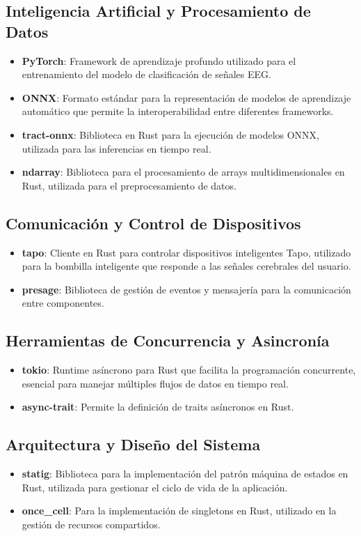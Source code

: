 \subsection{Inteligencia Artificial y Procesamiento de Datos}
\begin{itemize}
    \item \textbf{PyTorch}: Framework de aprendizaje profundo utilizado para el entrenamiento del modelo de clasificación de señales EEG.
    \item \textbf{ONNX}: Formato estándar para la representación de modelos de aprendizaje automático que permite la interoperabilidad entre diferentes frameworks.
    \item \textbf{tract-onnx}: Biblioteca en Rust para la ejecución de modelos ONNX, utilizada para las inferencias en tiempo real.
    \item \textbf{ndarray}: Biblioteca para el procesamiento de arrays multidimensionales en Rust, utilizada para el preprocesamiento de datos.
\end{itemize}

\subsection{Comunicación y Control de Dispositivos}
\begin{itemize}
    \item \textbf{tapo}: Cliente en Rust para controlar dispositivos inteligentes Tapo, utilizado para la bombilla inteligente que responde a las señales cerebrales del usuario.
    \item \textbf{presage}: Biblioteca de gestión de eventos y mensajería para la comunicación entre componentes.
\end{itemize}

\subsection{Herramientas de Concurrencia y Asincronía}
\begin{itemize}
    \item \textbf{tokio}: Runtime asíncrono para Rust que facilita la programación concurrente, esencial para manejar múltiples flujos de datos en tiempo real.
    \item \textbf{async-trait}: Permite la definición de traits asíncronos en Rust.
\end{itemize}

\subsection{Arquitectura y Diseño del Sistema}
\begin{itemize}
    \item \textbf{statig}: Biblioteca para la implementación del patrón máquina de estados en Rust, utilizada para gestionar el ciclo de vida de la aplicación.
    \item \textbf{once\_cell}: Para la implementación de singletons en Rust, utilizado en la gestión de recursos compartidos.
\end{itemize}

